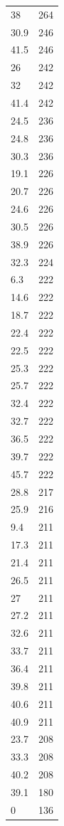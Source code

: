 \begin{table}[ht]
\begin{tabular}{lr}
  38 & 264 \\ 
  30.9 & 246 \\ 
  41.5 & 246 \\ 
  26 & 242 \\ 
  32 & 242 \\ 
  41.4 & 242 \\ 
  24.5 & 236 \\ 
  24.8 & 236 \\ 
  30.3 & 236 \\ 
  19.1 & 226 \\ 
  20.7 & 226 \\ 
  24.6 & 226 \\ 
  30.5 & 226 \\ 
  38.9 & 226 \\ 
  32.3 & 224 \\ 
  6.3 & 222 \\ 
  14.6 & 222 \\ 
  18.7 & 222 \\ 
  22.4 & 222 \\ 
  22.5 & 222 \\ 
  25.3 & 222 \\ 
  25.7 & 222 \\ 
  32.4 & 222 \\ 
  32.7 & 222 \\ 
  36.5 & 222 \\ 
  39.7 & 222 \\ 
  45.7 & 222 \\ 
  28.8 & 217 \\ 
  25.9 & 216 \\ 
  9.4 & 211 \\ 
  17.3 & 211 \\ 
  21.4 & 211 \\ 
  26.5 & 211 \\ 
  27 & 211 \\ 
  27.2 & 211 \\ 
  32.6 & 211 \\ 
  33.7 & 211 \\ 
  36.4 & 211 \\ 
  39.8 & 211 \\ 
  40.6 & 211 \\ 
  40.9 & 211 \\ 
  23.7 & 208 \\ 
  33.3 & 208 \\ 
  40.2 & 208 \\ 
  39.1 & 180 \\ 
  0 & 136 \\ 

\end{tabular}
\end{table}
